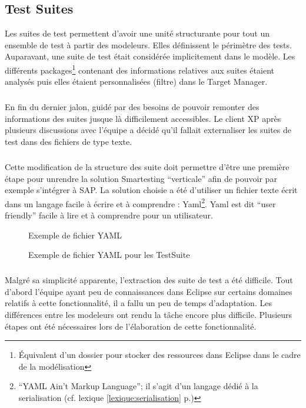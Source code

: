 \subsection{Test Suites}
Les suites de test permettent d'avoir une unité structurante pour tout un ensemble de test à partir des modeleurs. Elles définissent le périmètre des tests. Auparavant, une suite de test était considérée implicitement dans le modèle. Les différents packages\footnote{Équivalent d'un dossier pour stocker des ressources dans Eclipse dans le cadre de la modélisation} contenant des informations relatives aux suites étaient analysés puis elles étaient personnalisées (filtre) dans le Target Manager. 
\subparagraph*{}
En fin du dernier jalon, guidé par des besoins de pouvoir remonter des informations des suites jusque là difficilement accessibles. Le client XP après plusieurs discussions avec l'équipe a décidé qu'il fallait externaliser les suites de test dans des fichiers de type texte.
\subparagraph*{}
Cette modification de la structure des suite doit permettre d'être une première étape pour unrendre la solution Smartesting ``verticale'' afin de pouvoir par exemple s'intégrer à SAP. La solution choisie a été d'utiliser un fichier texte écrit dans un langage facile à écrire et à comprendre : Yaml\footnote{``YAML Ain't Markup Language''; il s'agit d'un langage dédié à la serialisation (cf. lexique \ref{lexique:serialisation} p.\pageref{lexique:serialisation})}. Yaml est dit ``user friendly'' facile à lire et à comprendre pour un utilisateur.
\begin{figure}[!ht]
\centering
{}
\caption{Exemple de fichier YAML}
\label{figure:exYaml}
\end{figure}
\begin{figure}[!ht]
\centering
{}
\caption{Exemple de fichier YAML pour les TestSuite}
\label{figure:exTestSuite}
\end{figure} 
\subparagraph*{}
Malgré sa simplicité apparente, l'extraction des suite de test a été difficile. Tout d'abord l'équipe ayant peu de connaissances dans Eclipse sur certains domaines relatifs à cette fonctionnalité, il a fallu un peu de temps d'adaptation. Les différences entre les modeleurs ont rendu la tâche encore plus difficile. Plusieurs étapes ont été nécessaires lors de l'élaboration de cette fonctionnalité.
